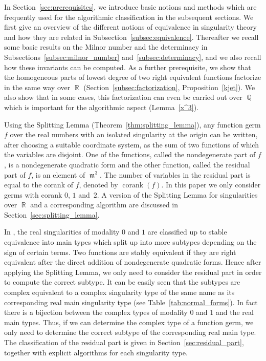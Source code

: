 \documentclass[noend]{amsproc}
\theoremstyle{definition}
\DeclareMathOperator{\m}{\mathfrak{m}}
\DeclareMathOperator{\corank}{corank}
\DeclareMathOperator{\Q}{\mathbb{Q}}
\DeclareMathOperator{\R}{\mathbb{R}}
\begin{document}
In Section~\ref{sec:prerequisites}, we introduce basic notions and methods
which are frequently used for the algorithmic classification in the subsequent
sections. We first give an overview of the different notions of equivalence in
singularity theory and how they are related in
Subsection~\ref{subsec:equivalence}. Thereafter we recall some basic results on
the Milnor number and the determinacy in Subsections~\ref{subsec:milnor_number}
and~\ref{subsec:determinacy}, and we also recall how these invariants can be
computed. As a further prerequisite, we show that the homogeneous parts of
lowest degree of two right equivalent functions factorize in the same way over
$\R$ (Section~\ref{subsec:factorization}, Proposition~\ref{kjet}). We also show
that in some cases, this factorization can even be carried out over $\Q$ which
is important for the algorithmic aspect (Lemma~\ref{x^3}).

Using the Splitting Lemma (Theorem~\ref{thm:splitting_lemma}), any function
germ $f$ over the real numbers with an isolated singularity at the origin can
be written, after choosing a suitable coordinate system, as the sum of two
functions of which the variables are disjoint. One of the functions, called the
nondegenerate part of $f$, is a nondegenerate quadratic form and the other
function, called the residual part of $f$, is an element of $\m^3$. The number
of variables in the residual part is equal to the corank of $f$, denoted by
$\corank(f)$. In this paper we only consider germs with corank $0$, $1$
and~$2$. A version of the Splitting Lemma for singularities over $\R$ and a
corresponding algorithm are discussed in Section~\ref{sec:splitting_lemma}.

In \citet{AVG1985}, the real singularities of modality $0$ and $1$ are
classified up to stable equivalence into main types which split up into more
subtypes
depending on the sign of certain terms. Two functions are stably equivalent if
they are right equivalent after the direct addition of nondegenerate quadratic
forms. Hence after applying the Splitting Lemma, we only need to consider the
residual part in order to compute the correct subtype. It can be easily seen
that the subtypes are complex equivalent to a complex singularity type of the
same name as its corresponding real main singularity type (see
Table~\ref{tab:normal_forms}). In fact there is a bijection between the complex
types of modality $0$ and $1$ and the real main types. Thus, if we can
determine the complex type of a function germ, we only need to determine the
correct subtype of the corresponding real main type. The classification of the
residual part is given in Section~\ref{sec:residual_part}, together with
explicit algorithms for each singularity type.
\end{document}
